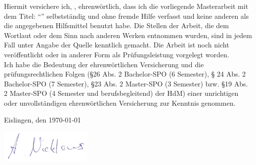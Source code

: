 \documentclass[a4paper, 12pt]{article}
\makeatletter
\let\Title\@title
\let\Author\@author
\makeatother
\begin{document}
	Hiermit versichere ich, \Author, ehrenwörtlich, dass ich die vorliegende Masterarbeit mit dem Titel: \enquote{\Title} selbstständig und ohne fremde Hilfe verfasst und keine anderen als die angegebenen Hilfsmittel benutzt habe.
  Die Stellen der Arbeit, die dem Wortlaut oder dem Sinn nach anderen Werken entnommen wurden, sind in jedem Fall unter Angabe der Quelle kenntlich gemacht.
  Die Arbeit ist noch nicht veröffentlicht oder in anderer Form als Prüfungsleistung vorgelegt worden.\\
	
	Ich habe die Bedeutung der ehrenwörtlichen Versicherung und die prüfungsrechtlichen Folgen (§26 Abs. 2 Bachelor-SPO (6 Semester), § 24 Abs. 2 Bachelor-SPO (7 Semester), §23 Abs. 2 Master-SPO (3 Semester) bzw. §19 Abs. 2 Master-SPO (4 Semester und berufsbegleitend) der HdM) einer unrichtigen oder unvollständigen ehrenwörtlichen Versicherung zur Kenntnis genommen.
	\vspace{30px}
	
	Eislingen, den \today
	\vspace{20px}
	
	\includegraphics[height=60px]{img/unterschrift.png}
	\vspace{10px}
	
	\Author

\pagebreak
\end{document}
